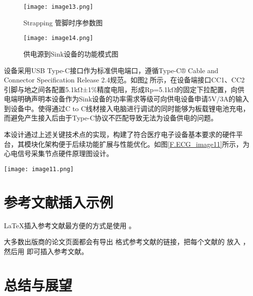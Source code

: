 \begin{figure}[H]
    \centering
    \texttt{[image: image13.png]}
    \caption{Strapping 管脚时序参数图}
    \label{F.ECG_image13}
\end{figure}

\begin{figure}[hbt]%
    \centering
    \texttt{[image: image14.png]}
    \caption{供电源到Sink设备的功能模式图}
    \label{F.ECG_image14}
\end{figure}

设备采用USB Type-C接口作为标准供电端口，遵循Type-C® Cable and Connector Specification Release 2.4规范。如图\ref{F.ECG_image14} \cite{usbtypec24}所示，在设备端接口CC1、CC2引脚与地之间各配置5.1kΩ±1$\%$精度电阻，形成Rp=5.1kΩ的固定下拉配置，向供电端明确声明本设备作为Sink设备的功率需求等级可向供电设备申请5V/3A的输入到设备中。使得通过C to C线材接入电脑进行调试的同时能够为板载锂电池充电，而避免产生接入后由于Type-C协议不匹配导致无法为设备供电的问题。

本设计通过上述关键技术点的实现，构建了符合医疗电子设备基本要求的硬件平台，其模块化架构便于后续功能扩展与性能优化。如图\ref{F.ECG_image11}所示，为心电信号采集节点硬件原理图设计。

\begin{sidewaysfigure}
    \centering
    \texttt{[image: image11.png]}
    \caption{心电信号采集节点硬件原理图设计}
    \label{F.ECG_image11}
\end{sidewaysfigure}



\newpage    %

\section{参考文献插入示例}

\LaTeX \cite{lamport1994latex}插入参考文献最方便的方式是使用 \cite{pritchard1969statistical}。

大多数出版商的论文页面都会有导出  格式参考文献的链接，把每个文献的  放入 ，然后用  即可插入参考文献。


\newpage    %


\section{总结与展望}


